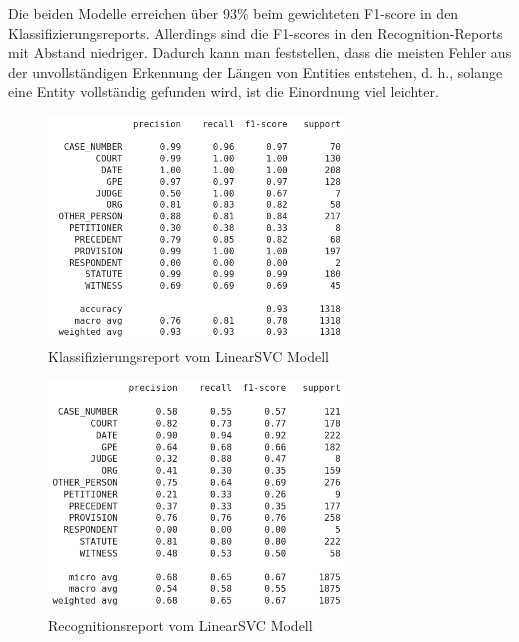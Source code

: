 \documentclass[paper=A4, ngerman, fontsize=12pt]{article}
\begin{document}
	\indent
	Die beiden Modelle erreichen über 93\% beim gewichteten F1-score in den Klassifizierungsreports. Allerdings sind die F1-scores in den Recognition-Reports mit Abstand niedriger. Dadurch kann man feststellen, dass die meisten Fehler aus der unvollständigen Erkennung der Längen von Entities entstehen, d. h., solange eine Entity vollständig gefunden wird, ist die Einordnung viel leichter. 
	
	\begin{figure}
		\begin{center}
			\includegraphics[width=8cm]{Illustrations/svc_classify.png}
			\caption{Klassifizierungsreport vom LinearSVC Modell}
			\label{Klassifizierungsreport vom LinearSVC Modell}
		\end{center}
	\end{figure}

	\begin{figure}
		\begin{center}
			\includegraphics[width=8cm]{Illustrations/svc_recognition.png}
			\caption{Recognitionsreport vom LinearSVC Modell}
			\label{Recognitionsreport vom LinearSVC Modell}
		\end{center}
	\end{figure}
\end{document}
